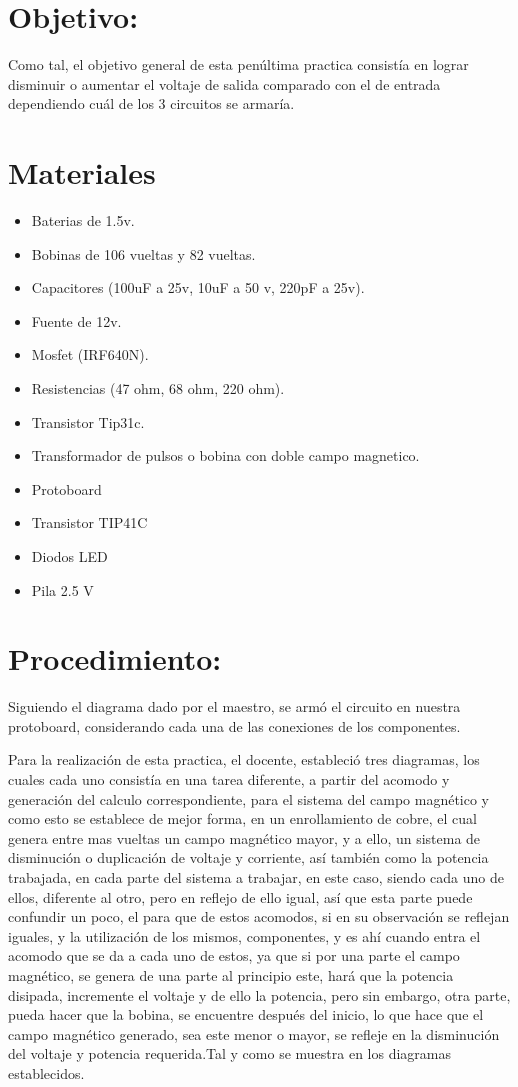 \documentclass[12pt,letterpaper]{article}
\begin{document}
\newpage

\section{Objetivo:}
Como tal, el objetivo general de esta penúltima practica consistía en lograr disminuir o aumentar el voltaje de salida comparado con el de entrada dependiendo cuál de los 3 circuitos se armaría. 
\section{Materiales}
\begin{itemize}
\item Baterias de 1.5v.
\item Bobinas de 106 vueltas y 82 vueltas.
\item Capacitores (100uF a 25v, 10uF a 50 v, 220pF a 25v).
\item Fuente de 12v.
\item Mosfet (IRF640N).
\item Resistencias (47 ohm, 68 ohm, 220 ohm).
\item Transistor Tip31c.
\item Transformador de pulsos o bobina con doble campo magnetico.
\item Protoboard
\item Transistor TIP41C
\item Diodos LED
\item Pila 2.5 V
\end{itemize}
\section{Procedimiento:}
Siguiendo el diagrama dado por el maestro, se armó el circuito en nuestra protoboard, considerando cada una de las conexiones de los componentes.

Para la realización de esta practica, el docente, estableció tres diagramas, los cuales cada uno consistía en una tarea diferente, a partir del acomodo y generación del calculo correspondiente, para el sistema del campo magnético y como esto se establece de mejor forma, en un enrollamiento de cobre, el cual genera entre mas vueltas un campo magnético mayor, y a ello, un sistema de disminución o duplicación de voltaje y corriente, así también como la potencia trabajada, en cada parte del sistema a trabajar, en este caso, siendo cada uno de ellos, diferente al otro, pero en reflejo de ello igual, así que esta parte puede confundir un poco, el para que de estos acomodos, si en su observación se reflejan iguales, y la utilización de los mismos, componentes, y es ahí cuando entra el acomodo que se da a cada uno de estos, ya que si por una parte el campo magnético, se genera de una parte al principio este, hará que la potencia disipada, incremente el voltaje y de ello la potencia, pero sin embargo, otra parte, pueda hacer que la bobina, se encuentre después del inicio, lo que hace que el campo magnético generado, sea este menor o mayor, se refleje en la disminución del voltaje y potencia requerida.Tal y como se muestra en los diagramas establecidos.\\
\end{document}
